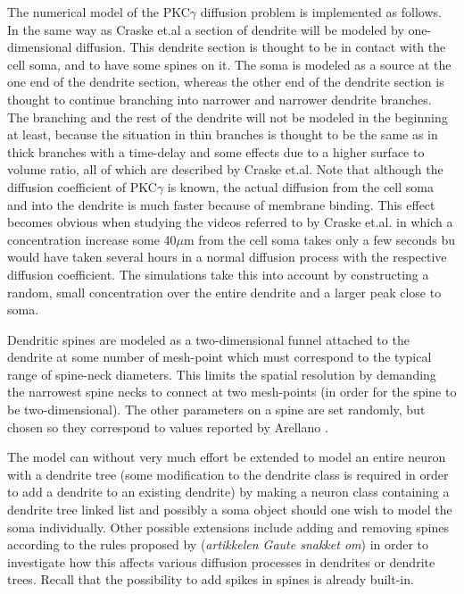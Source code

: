 The numerical model of the PKC$\gamma$ diffusion problem is implemented as follows. 
In the same way as Craske et.al \cite{craske2005spines} a section of dendrite will be modeled by one-dimensional diffusion. 
This dendrite section is thought to be in contact with the cell soma, and to have some spines on it. 
The soma is modeled as a source at the one end of the dendrite section, whereas the other end of the dendrite section is thought to continue branching into narrower and narrower dendrite branches. 
The branching and the rest of the dendrite will not be modeled in the beginning at least, because the situation in thin branches is thought to be the same as in thick branches with a time-delay and some effects due to a higher surface to volume ratio, all of which are described by Craske et.al. 
Note that although the diffusion coefficient of PKC$\gamma$ is known, the actual diffusion from the cell soma and into the dendrite is much faster because of membrane binding. 
This effect becomes obvious when studying the videos referred to by Craske et.al. in which a concentration increase some 40$\mu$m from the cell soma takes only a few seconds bu would have taken several hours in a normal diffusion process with the respective diffusion coefficient. 
The simulations take this into account by constructing a random, small concentration over the entire dendrite and a larger peak close to soma. 


Dendritic spines are modeled as a two-dimensional funnel attached to the dendrite at some number of mesh-point which must correspond to the typical range of spine-neck diameters. 
This limits the spatial resolution by demanding the narrowest spine necks to connect at two mesh-points (in order for the spine to be two-dimensional). 
The other parameters on a spine are set randomly, but chosen so they correspond to values reported by Arellano \cite{arellano2007ultrastructure}.

The model can without very much effort be extended to model an entire neuron with a dendrite tree (some modification to the dendrite class is required in order to add a dendrite to an existing dendrite) by making a neuron class containing a dendrite tree linked list and possibly a soma object should one wish to model the soma individually. 
Other possible extensions include adding and removing spines according to the rules proposed by (\emph{artikkelen Gaute snakket om}) in order to investigate how this affects various diffusion processes in dendrites or dendrite trees. 
Recall that the possibility to add spikes in spines is already built-in.

